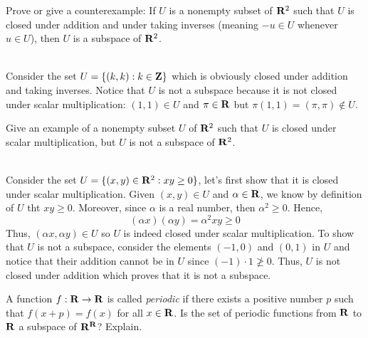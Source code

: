 \begin{exercise}
    Prove or give a counterexample: If $U$ is a nonempty subset of $\mathbf{R}^2$ such that $U$ is closed under addition and under taking inverses (meaning $-u \in U$ whenever $u \in U$), then $U$ is a subspace of $\mathbf{R}^2$. \\
\end{exercise}

\begin{solution}
    \\ Consider the set $U = \{(k,k) : k\in\mathbf{Z}\}$ which is obviously closed under addition and taking inverses. Notice that $U$ is not a subspace because it is not closed under scalar multiplication: $(1,1) \in U$ and $\pi \in \mathbf{R}$ but $\pi(1,1) = (\pi, \pi) \notin U$. \\
\end{solution}

\begin{exercise}
    Give an example of a nonempty subset $U$ of $\mathbf{R}^2$ such that $U$ is closed under scalar multiplication, but $U$ is not a subspace of $\mathbf{R}^2$. \\
\end{exercise}

\begin{solution}
    \\ Consider the set $U = \{(x,y) \in \mathbf{R}^2 : xy \geq 0\}$, let's first show that it is closed under scalar multiplication. Given $(x,y) \in U$ and $\alpha \in \mathbf{R}$, we know by definition of $U$ tht $xy \geq 0$. Moreover, since $\alpha$ is a real number, then $\alpha^2 \geq 0$. Hence,
    $$(\alpha x)(\alpha y) = \alpha^2 xy \geq 0$$
    Thus, $(\alpha x, \alpha y) \in U$ so $U$ is indeed closed under scalar multiplication. To show that $U$ is not a subspace, consider the elements $(-1, 0)$ and $(0, 1)$ in $U$ and notice that their addition cannot be in $U$ since $(-1) \cdot 1 \not\geq 0$. Thus, $U$ is not closed under addition which proves that it is not a subspace.\\
\end{solution}

\begin{exercise}
    A function $f : \mathbf{R} \to \mathbf{R}$ is called \textit{periodic} if there exists a positive number $p$ such that $f(x+p) = f(x)$ for all $x \in \mathbf{R}$. Is the set of periodic functions from $\mathbf{R}$ to $\mathbf{R}$ a subspace of $\mathbf{R}^{\mathbf{R}}$? Explain.\\
\end{exercise}

